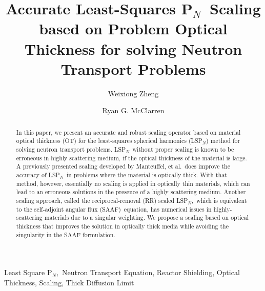 \documentclass[review]{elsarticle}
\newcommand{\pn}{P$_N$}
\begin{document}
\begin{frontmatter}

\title{Accurate Least-Squares P$_N$\ Scaling based on Problem Optical Thickness for solving Neutron Transport Problems}%

\author[mymainaddress]{Weixiong Zheng}

\author[ryanaddress]{Ryan G. McClarren}
\address[mymainaddress]{Department of Nuclear Engineering, University of California, Berkeley, 4103 Etcheverry Hall, Berkeley, CA 94720}
\address[ryanaddress]{Texas A\&M Nuclear Engineering, 3133\ TAMU,~College Station, TX 77843-3133}
\begin{abstract}
	In this paper, we present an accurate and robust scaling operator based on material optical thickness (OT) for the least-squares spherical harmonics (LS\pn) method for solving neutron transport problems. LS\pn\ without proper scaling is known to be erroneous in highly scattering medium, if the optical thickness of the material is large. A previously presented scaling developed by Manteuffel, et al.\ does improve the accuracy of LS\pn\, in problems where the material is optically thick. With that method, however, essentially no scaling is applied in optically thin materials, which can lead to an erroneous solutions in the presence of a highly scattering medium. Another scaling approach, called the reciprocal-removal (RR) scaled LS\pn,\ which is equivalent to the self-adjoint angular flux (SAAF)\ equation, has numerical issues in highly-scattering materials due to a singular weighting.  We propose a scaling based on optical thickness that improves the solution in optically thick media while avoiding the singularity  in the SAAF formulation.
\end{abstract}

\begin{keyword}
	Least Square \pn,\ Neutron Transport Equation, Reactor Shielding, Optical Thickness, Scaling, Thick Diffusion Limit
\end{keyword}

\end{frontmatter}
\end{document}
